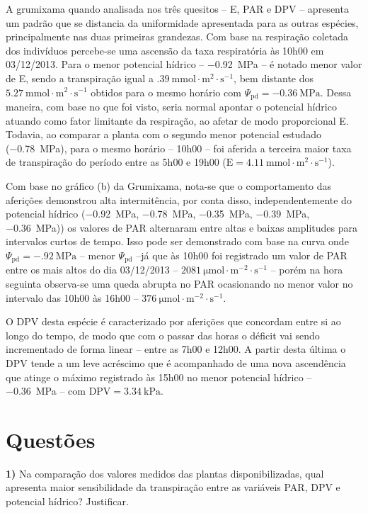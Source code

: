 \documentclass[a4paper, 12pt]{article}
\numberwithin{equation}{section}
\begin{document}
	A grumixama quando analisada nos três quesitos -- E, PAR e DPV -- apresenta um padrão que se distancia da uniformidade apresentada para as outras espécies, principalmente nas duas primeiras grandezas. Com base na respiração coletada dos indivíduos percebe-se uma ascensão da taxa respiratória às 10h00 em 03/12/2013. Para o menor potencial hídrico -- \SI{-.92}{\mega\pascal} -- é notado menor valor de E, sendo a transpiração igual a $\SI{.39}{\milli\mole\cdot\meter^{2}\cdot\second^{-1}}$, bem distante dos $\SI{5.27}{\milli\mole\cdot\meter^{2}\cdot\second^{-1}}$ obtidos para o mesmo horário com $\Psi_{\textrm{pd}}=\SI{-0.36}{\mega\pascal}$. Dessa maneira, com base no que foi visto, seria normal apontar o potencial hídrico atuando como fator limitante da respiração, ao afetar de modo proporcional E. Todavia, ao comparar a planta com o segundo menor potencial estudado (\SI{-.78}{\mega\pascal}), para o mesmo horário -- 10h00 -- foi aferida a terceira maior taxa de transpiração do período entre as 5h00 e 19h00 ($\textrm{E}=\SI{4.11}{\milli\mole\cdot\meter^{2}\cdot\second^{-1}}$).
	
	Com base no gráfico (b) da Grumixama, nota-se que o comportamento das aferições demonstrou alta intermitência, por conta disso, independentemente do potencial hídrico (\SI{-.92}{\mega\pascal}, \SI{-.78}{\mega\pascal}, \SI{-.35}{\mega\pascal}, \SI{-.39}{\mega\pascal}, \SI{-.36}{\mega\pascal})) os valores de PAR alternaram entre altas e baixas amplitudes para intervalos curtos de tempo. Isso pode ser demonstrado com base na curva onde $\Psi_{\textrm{pd}}=\SI{-.92}{\mega\pascal}$ -- menor $\Psi_{\textrm{pd}}$ --já que às 10h00 foi registrado um valor de PAR entre os mais altos do dia 03/12/2013 -- $\SI{2081}{\micro\mole\cdot\meter^{-2}\cdot\second^{-1}}$ -- porém na hora seguinta observa-se uma queda abrupta no PAR ocasionando no menor valor no intervalo das 10h00 às 16h00 -- $\SI{376}{\micro\mole\cdot\meter^{-2}\cdot\second^{-1}}$. 
	
	O DPV desta espécie é caracterizado por aferições que concordam entre si ao longo do tempo, de modo que com o passar das horas o déficit vai sendo incrementado de forma linear -- entre as 7h00 e 12h00. A partir desta última o DPV tende a um leve acréscimo que é acompanhado de uma nova ascendência que atinge o máximo registrado às 15h00 no menor potencial hídrico -- \SI{-.36}{\mega\pascal} -- com $\textrm{DPV}=\SI{3.34}{\kilo\pascal}$.
	
	\section{Questões}
	\noindent\textbf{1)} Na comparação dos valores medidos das plantas disponibilizadas, qual apresenta maior sensibilidade da transpiração entre as variáveis PAR, DPV e potencial hídrico? Justificar.\\
	
\end{document}
